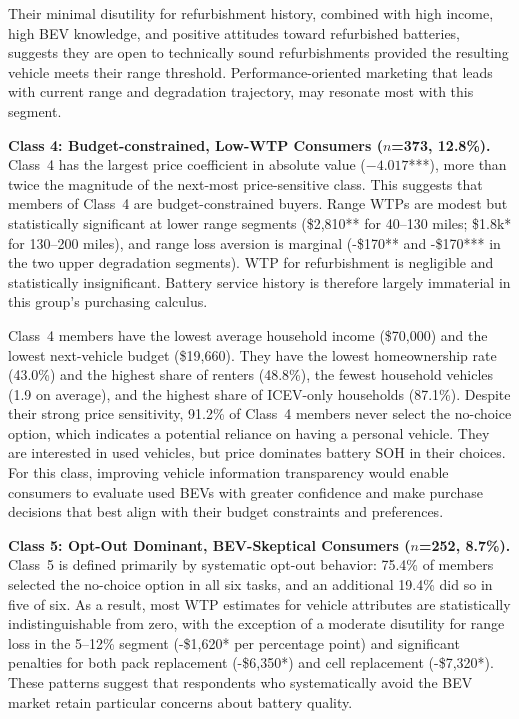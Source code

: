 \documentclass[a4paper,fleqn]{cas-sc}   %
\begin{document}
Their minimal disutility for refurbishment history, combined with high income, high BEV knowledge, and positive attitudes toward refurbished batteries, suggests they are open to technically sound refurbishments provided the resulting vehicle meets their range threshold. Performance-oriented marketing that leads with current range and degradation trajectory, may resonate most with this segment.

\medskip

\noindent\textbf{Class 4: Budget-constrained, Low-WTP Consumers ($n$=373, 12.8\%).}\\
Class~4 has the largest price coefficient in absolute value ($-4.017$***), more than twice the magnitude of the next-most price-sensitive class. This suggests that members of Class~4 are budget-constrained buyers. Range WTPs are modest but statistically significant at lower range segments (\$2,810** for 40--130 miles; \$1.8k* for 130--200 miles), and range loss aversion is marginal (-\$170** and -\$170*** in the two upper degradation segments). WTP for refurbishment is negligible and statistically insignificant. Battery service history is therefore largely immaterial in this group's purchasing calculus.

Class~4 members have the lowest average household income (\$70,000) and the lowest next-vehicle budget (\$19,660). They have the lowest homeownership rate (43.0\%) and the highest share of renters (48.8\%), the fewest household vehicles (1.9 on average), and the highest share of ICEV-only households (87.1\%). Despite their strong price sensitivity, 91.2\% of Class~4 members never select the no-choice option, which indicates a potential reliance on having a personal vehicle. They are interested in used vehicles, but price dominates battery SOH in their choices. For this class, improving vehicle information transparency would enable consumers to evaluate used BEVs with greater confidence and make purchase decisions that best align with their budget constraints and preferences.

\medskip

\noindent\textbf{Class 5: Opt-Out Dominant, BEV-Skeptical Consumers ($n$=252, 8.7\%).}\\
Class~5 is defined primarily by systematic opt-out behavior: 75.4\% of members selected the no-choice option in all six tasks, and an additional 19.4\% did so in five of six. As a result, most WTP estimates for vehicle attributes are statistically indistinguishable from zero, with the exception of a moderate disutility for range loss in the 5--12\% segment (-\$1,620* per percentage point) and significant penalties for both pack replacement (-\$6,350*) and cell replacement (-\$7,320*). These patterns suggest that respondents who systematically avoid the BEV market retain particular concerns about battery quality.
\end{document}
